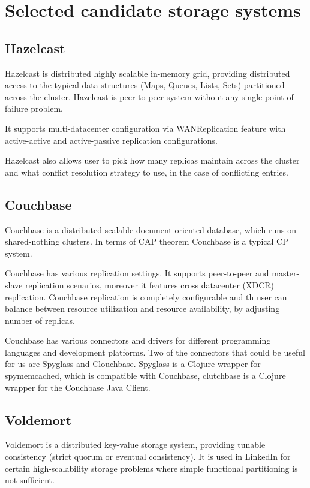\documentclass[a4paper]{article}
\begin{document}
\section{Selected candidate storage systems}
\label{sec:candidates}

\subsection*{Hazelcast}
Hazelcast is distributed highly scalable in-memory grid, providing distributed access to the typical data structures (Maps, Queues, Lists, Sets) partitioned across the cluster. 
Hazelcast is peer-to-peer system without any single point of failure problem.

It supports multi-datacenter configuration via WANReplication feature with active-active and active-passive replication configurations.

Hazelcast also allows user to pick how many replicas maintain across the cluster and what conflict resolution strategy to use, in the case of conflicting entries.  

\subsection*{Couchbase}

Couchbase is a distributed scalable document-oriented database, which runs on shared-nothing clusters.
In terms of CAP theorem Couchbase is a typical CP system.

Couchbase has various replication settings.
It supports peer-to-peer and master-slave replication scenarios, moreover it features cross datacenter (XDCR) replication.
Couchbase replication is completely configurable and th user can balance between resource utilization and resource availability, by adjusting number of replicas.

Couchbase has various connectors and drivers for different programming languages and development platforms. 
Two of the connectors that could be useful for us are Spyglass and Clouchbase. 
Spyglass is a Clojure wrapper for spymemcached, which is compatible with Couchbase, clutchbase is a Clojure wrapper for the Couchbase Java Client.

\subsection*{Voldemort}

Voldemort is a distributed key-value storage system, providing tunable consistency (strict quorum or eventual consistency). It is used in LinkedIn for certain 
high-scalability storage problems where simple functional partitioning is not sufficient. 
\end{document}
